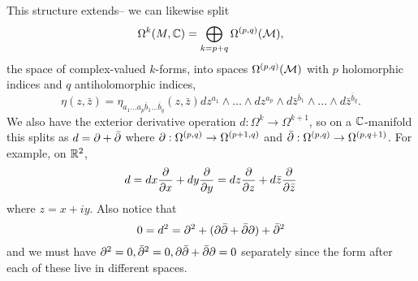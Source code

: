This structure extends-- we can likewise split
\begin{equation}
    \Omega^k(M,\CC) =\bigoplus_{k=p+q} \Omega^{(p,q)} (\cM),
\end{equation}
the space of complex-valued $k$-forms, into spaces $\Omega^{(p,q)}(\cM)$ with $p$ holomorphic indices and $q$ antiholomorphic indices,
\begin{equation}
    \eta(z,\bar z)=\eta_{a_1\ldots a_p \bar b_1 \ldots \bar b_q}(z,\bar z) dz^{a_1}\wedge \ldots \wedge dz^{a_p} \wedge d\bar z^{\bar b_1}\wedge \ldots \wedge d\bar z^{\bar b_q}.
\end{equation}
We also have the exterior derivative operation $d:\Omega^k\to \Omega^{k+1}$, so on a $\CC$-manifold this splits as $d=\p + \bar \p$ where $\p:\Omega^{(p,q)}\to \Omega^{(p+1,q)}$ and $\bar \p: \Omega^{(p,q)}\to \Omega^{(p,q+1)}$. For example, on $\RR^2$,
\begin{equation}
    d=dx \P{}{x} +dy\P{}{y} = dz \P{}{z} + d\bar z \P{}{\bar z}
\end{equation}
where $z=x+iy$. Also notice that
\begin{equation}
    0=d^2=\p^2 +(\p \bar \p + \bar \p \p)+\bar \p^2
\end{equation}
and we must have $\p^2=0, \bar \p^2 = 0, \p \bar \p +\bar \p \p =0$ separately since the form after each of these live in different spaces.
